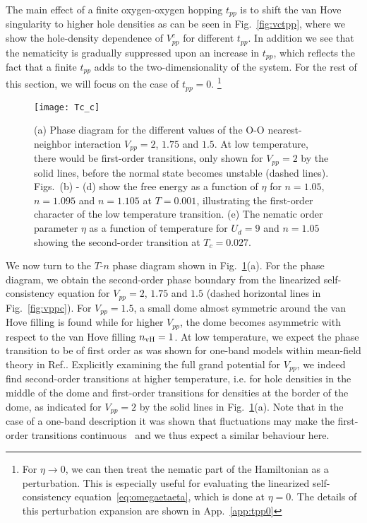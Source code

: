 \documentclass[prb, twocolumn,showpacs,preprintnumbers,amsmath,amssymb, floatfix]{revtex4}
\begin{document}
The main effect of a finite oxygen-oxygen hopping $t_{pp}$ is to shift
the van Hove singularity to higher hole densities as can be seen in
Fig.~\ref{fig:vctpp}, where
we show the hole-density dependence of $V_{pp}^c$
for different $t_{pp}$.
In addition
we see that the nematicity is gradually suppressed upon an increase in
$t_{pp}$,
which reflects the fact that a finite $t_{pp}$ adds to the
 two-dimensionality of the system.
For the rest of this section, we will focus on the case of $t_{pp} =
0$.
\footnote{For $\eta\rightarrow 0$, we can then treat the nematic part of the Hamiltonian as a perturbation.  This is especially useful for evaluating the linearized self-consistency equation~\eqref{eq:omegaetaeta}, which is done at $\eta = 0$. The details of this perturbation expansion are shown in App.~\ref{app:tpp0}}
\begin{figure}[bt]
  \begin{center}
    \texttt{[image: Tc\_c]}
  \end{center}
  \caption{(a) Phase diagram for the different values of the O-O
    nearest-neighbor interaction $V_{pp} = 2$, $1.75$ and $1.5$. At
    low temperature, there would be first-order transitions, only
    shown for $V_{pp} = 2$ by the solid lines, before the normal state
    becomes unstable (dashed lines). Figs.~(b) - (d) show the free energy
    as a function of $\eta$ for $n=1.05$, $n=1.095$ and $n=1.105$ at $T=0.001$,
    illustrating the first-order character of the low temperature
    transition. 
    (e) The nematic order parameter $\eta$ as a function of
    temperature for $U_{d}=9$ and $n=1.05$ showing the second-order
    transition at $T_c=0.027$.}
  \label{fig:tcvpp}
\end{figure}

We now turn to the $T$-$n$ phase diagram shown in Fig.~\ref{fig:tcvpp}(a).
For the phase diagram, we obtain the second-order
phase boundary from the linearized self-consistency equation
for $V_{pp} = 2$, $1.75$ and $1.5$ (dashed horizontal lines in Fig.~\ref{fig:vppc}). For $V_{pp}=1.5$, a small dome almost symmetric around the van
Hove filling is found while for higher $V_{pp}$, the dome becomes
asymmetric with respect to the van Hove filling $n_{\rm vH}=1$.
At low temperature, we expect the phase transition to be of first order as was shown for one-band models within mean-field theory in Ref.\cite{yamase:2005}.
Explicitly examining the full grand potential for $V_{pp}$, we indeed find second-order transitions at higher temperature,
i.e. for hole densities in the middle of the dome and first-order
transitions for densities at the border of the dome, as indicated for
$V_{pp}=2$ by the solid lines in Fig.~\ref{fig:tcvpp}(a). Note that in the case of a one-band description it was shown that fluctuations may make the first-order transitions continuous~\cite{jakubczyk:2009} and we thus expect a similar behaviour here. 
 
\end{document}
